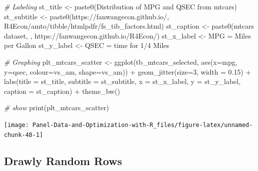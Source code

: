 \documentclass[
]{book}
\newenvironment{Shaded}{\begin{snugshade}}{\end{snugshade}}
\newcommand{\AttributeTok}[1]{\textcolor[rgb]{0.77,0.63,0.00}{#1}}
\newcommand{\CommentTok}[1]{\textcolor[rgb]{0.56,0.35,0.01}{\textit{#1}}}
\newcommand{\DecValTok}[1]{\textcolor[rgb]{0.00,0.00,0.81}{#1}}
\newcommand{\FloatTok}[1]{\textcolor[rgb]{0.00,0.00,0.81}{#1}}
\newcommand{\FunctionTok}[1]{\textcolor[rgb]{0.00,0.00,0.00}{#1}}
\newcommand{\NormalTok}[1]{#1}
\newcommand{\OtherTok}[1]{\textcolor[rgb]{0.56,0.35,0.01}{#1}}
\newcommand{\SpecialCharTok}[1]{\textcolor[rgb]{0.00,0.00,0.00}{#1}}
\newcommand{\StringTok}[1]{\textcolor[rgb]{0.31,0.60,0.02}{#1}}
\begin{document}
\begin{Shaded}
\begin{Highlighting}[]
\CommentTok{\# Labeling}
\NormalTok{st\_title }\OtherTok{\textless{}{-}} \FunctionTok{paste0}\NormalTok{(}\StringTok{\textquotesingle{}Distribution of MPG and QSEC from mtcars\textquotesingle{}}\NormalTok{)}
\NormalTok{st\_subtitle }\OtherTok{\textless{}{-}} \FunctionTok{paste0}\NormalTok{(}\StringTok{\textquotesingle{}https://fanwangecon.github.io/\textquotesingle{}}\NormalTok{,}
                      \StringTok{\textquotesingle{}R4Econ/amto/tibble/htmlpdfr/fs\_tib\_factors.html\textquotesingle{}}\NormalTok{)}
\NormalTok{st\_caption }\OtherTok{\textless{}{-}} \FunctionTok{paste0}\NormalTok{(}\StringTok{\textquotesingle{}mtcars dataset, \textquotesingle{}}\NormalTok{,}
                     \StringTok{\textquotesingle{}https://fanwangecon.github.io/R4Econ/\textquotesingle{}}\NormalTok{)}
\NormalTok{st\_x\_label }\OtherTok{\textless{}{-}} \StringTok{\textquotesingle{}MPG = Miles per Gallon\textquotesingle{}}
\NormalTok{st\_y\_label }\OtherTok{\textless{}{-}} \StringTok{\textquotesingle{}QSEC = time for 1/4 Miles\textquotesingle{}}

\CommentTok{\# Graphing}
\NormalTok{plt\_mtcars\_scatter }\OtherTok{\textless{}{-}} 
  \FunctionTok{ggplot}\NormalTok{(tb\_mtcars\_selected, }
         \FunctionTok{aes}\NormalTok{(}\AttributeTok{x=}\NormalTok{mpg, }\AttributeTok{y=}\NormalTok{qsec, }\AttributeTok{colour=}\NormalTok{vs\_am, }\AttributeTok{shape=}\NormalTok{vs\_am)) }\SpecialCharTok{+}
  \FunctionTok{geom\_jitter}\NormalTok{(}\AttributeTok{size=}\DecValTok{3}\NormalTok{, }\AttributeTok{width =} \FloatTok{0.15}\NormalTok{) }\SpecialCharTok{+}
  \FunctionTok{labs}\NormalTok{(}\AttributeTok{title =}\NormalTok{ st\_title, }\AttributeTok{subtitle =}\NormalTok{ st\_subtitle,}
       \AttributeTok{x =}\NormalTok{ st\_x\_label, }\AttributeTok{y =}\NormalTok{ st\_y\_label, }\AttributeTok{caption =}\NormalTok{ st\_caption) }\SpecialCharTok{+}
  \FunctionTok{theme\_bw}\NormalTok{()}

\CommentTok{\# show}
\FunctionTok{print}\NormalTok{(plt\_mtcars\_scatter)}
\end{Highlighting}
\end{Shaded}

\begin{center}\texttt{[image: Panel-Data-and-Optimization-with-R\_files/figure-latex/unnamed-chunk-48-1]} \end{center}

\hypertarget{drawly-random-rows}{%
\subsection{Drawly Random Rows}\label{drawly-random-rows}}
\end{document}
